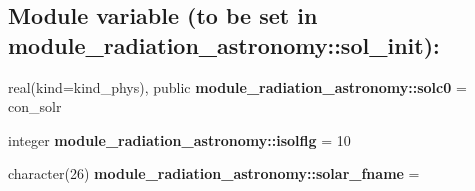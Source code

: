 \subsection*{Module variable (to be set in module\+\_\+radiation\+\_\+astronomy\+:\+:sol\+\_\+init)\+:}
\begin{DoxyCompactItemize}
\item 
\mbox{\label{group__module__radiation__astronomy_ga37e08872f67023b11f839ac15151af09}} 
real(kind=kind\+\_\+phys), public {\bfseries module\+\_\+radiation\+\_\+astronomy\+::solc0} = con\+\_\+solr
\item 
\mbox{\label{group__module__radiation__astronomy_ga7ea431b6d4f4d6ee1f6545d6baeee44f}} 
integer {\bfseries module\+\_\+radiation\+\_\+astronomy\+::isolflg} = 10
\item 
\mbox{\label{group__module__radiation__astronomy_ga05ee7e378d38b90242738b9bf6c40c00}} 
character(26) {\bfseries module\+\_\+radiation\+\_\+astronomy\+::solar\+\_\+fname} = \textquotesingle{} \textquotesingle{}
\end{DoxyCompactItemize}
